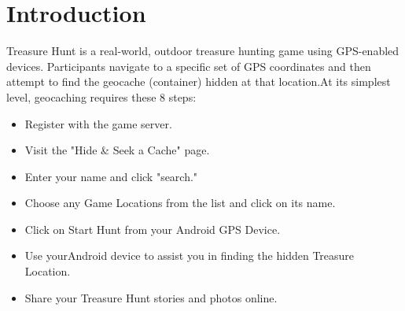 	
	
	
	
	\makeatletter
	\def\@makechapterhead#1{%
	  \vspace*{50\p@}%
	  {\parindent \z@ \centering\normalfont
	    \ifnum \c@secnumdepth >\m@ne
	      \if@mainmatter
	         \Large\bfseries \@chapapp\space \thechapter
 	        \par\nobreak
	        \vskip 20\p@
	      \fi
	    \fi
	    \interlinepenalty\@M
	     \Large \bfseries #1\par\nobreak
	
	    \vskip 40\p@
	  }}
	\def\@makeschapterhead#1{%
	  \vspace*{50\p@}%
	  {\parindent \z@ \centering 
	    \normalfont
	    \interlinepenalty\@M
	    \Large\bfseries  #1\par\nobreak
	    \vskip 40\p@
	  }}
	\makeatother
	\titlespacing*{\chapter}{0pt}{0pt}{12pt}
	
	
	\chapter{ Introduction}
	Treasure Hunt is a real-world, outdoor treasure hunting game using GPS-enabled devices. Participants navigate to a specific set of GPS coordinates and then attempt to find the geocache (container) hidden at that location.At its simplest level, geocaching requires these 8 steps:
	\begin{itemize}
	
	
	
	  \item Register with the game server.
	  \item Visit the "Hide & Seek a Cache" page.
	  \item Enter your name  and click "search."
	  \item Choose any Game Locations from the list and click on its name.
	  \item Click on Start Hunt from your Android  GPS Device.
	  \item Use yourAndroid  device to assist you in finding the hidden Treasure Location.
	   \item Share your Treasure Hunt stories and photos online.
	 
	\end{itemize}
	
